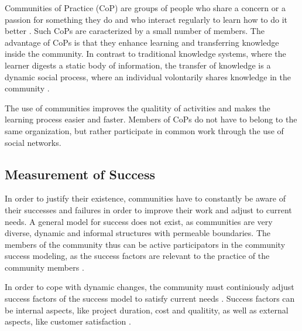 Communities of Practice (CoP) are groups of people who share a concern or a passion for something they do and who interact regularly to learn how to do it better \cite{Weng98}.
Such CoPs are caracterized by a small number of members. The advantage of CoPs is that they enhance learning and transferring knowledge inside the community. In contrast to traditional knowledge systems, where the learner digests a static body of information, the transfer of knowledge is a dynamic social process, where an individual volontarily shares knowledge in the community \cite{AMMi15,Kern08}.

The use of communities improves the qualitity of activities and makes the learning process easier\cite{SaAr05} and faster\cite{CuZe05}. Members of CoPs do not have to belong to the same organization, but rather participate in common work through the use of social networks\cite{CuZe05}.

\subsection{Measurement of Success}
In order to justify their existence, communities have to constantly be aware of their successes and failures in order to improve their work and adjust to current needs. A general model for success does not exist, as communities are very diverse, dynamic and informal structures with permeable boundaries. The members of the community thus can be active participators in the community success modeling, as the success factors are relevant to the practice of the community members \cite{RKJa15}.

In order to cope with dynamic changes, the community must continiously adjust success factors of the success model to satisfy current needs . Success factors can be internal aspects, like project duration, cost and qualitity, as well as external aspects, like customer satisfaction \cite{AgRa06}.

